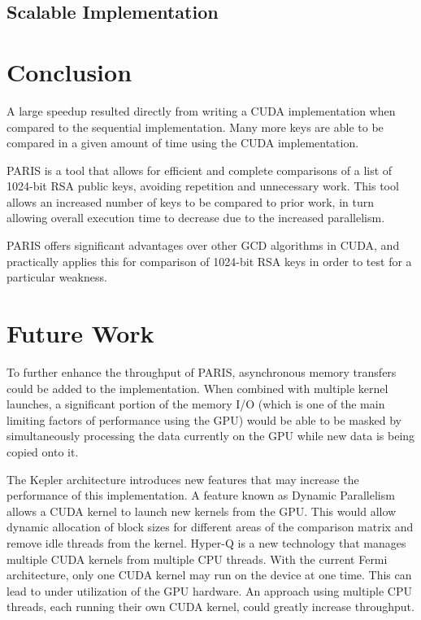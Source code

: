 \documentclass[12pt]{ucthesis}
\begin{document}
\section{Scalable Implementation}
\label{scaleimpl}


\chapter{Conclusion}
\label{sec:concl}
A large speedup resulted directly from writing a CUDA 
implementation when compared to the sequential implementation. Many 
more keys are able to be compared in a given amount of time using the CUDA
implementation. 

PARIS is a tool that allows for efficient and complete comparisons of a list of
1024-bit RSA public keys, avoiding repetition and unnecessary work. This tool
allows an increased number of keys to be compared to prior work, in turn
allowing overall execution time to decrease due to the increased parallelism.

PARIS offers significant advantages over other GCD algorithms in CUDA, and
practically applies this for comparison of 1024-bit RSA keys in order to test
for a particular weakness.


\chapter{Future Work}
\label{sec:future}
To further enhance the throughput of PARIS, asynchronous memory transfers could
be added to the implementation. When combined with multiple kernel launches, a
significant portion of the memory I/O (which is one of the main limiting
factors of performance using the GPU) would be able to be masked by
simultaneously processing the data currently on the GPU while new data is being
copied onto it.

The Kepler architecture introduces new features that may increase the 
performance of this implementation. A feature known as Dynamic Parallelism 
allows a CUDA kernel to launch new kernels from the GPU. This would allow
dynamic allocation of block sizes for different areas of the comparison matrix
and remove idle threads from the kernel. Hyper-Q is a new technology that
manages multiple CUDA kernels from multiple CPU threads. With the current Fermi
architecture, only one CUDA kernel may run on the device at one time. This can
lead to under utilization of the GPU hardware. An approach using multiple CPU
threads, each running their own CUDA kernel, could greatly increase throughput.
\end{document}

